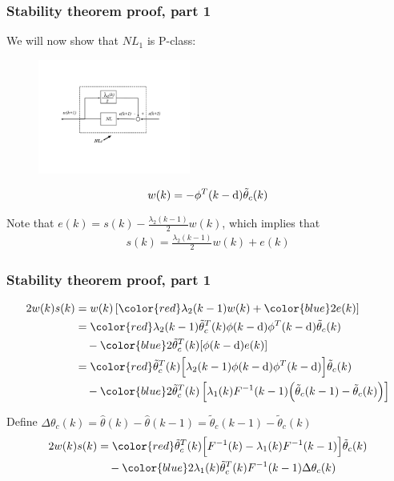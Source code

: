 \begin{frame}
    \frametitle{Stability theorem proof, part 1}

    We will now show that $NL_1$ is P-class:
    \begin{figure}[h]
        \centering
        \includegraphics[width=5cm]{figs_NL1}\\
    \end{figure}
    \begin{align*}
        w(k) = -\phi^T(k-\textrm{d}) \tilde{\theta}_c(k)
    \end{align*}
    \pause

    Note that $\displaystyle e(k) = s(k) - \frac{\lambda_2(k-1)}{2} w(k)$, which implies that
    \begin{align*}
        s(k) = \frac{\lambda_2(k-1)}{2} w(k) + e(k)
    \end{align*}

\end{frame}

\begin{frame}
    \frametitle{Stability theorem proof, part 1}

    \begin{align*}
        2 w(k) s(k) & = w(k) \left[ {\color{red} \lambda_2(k-1) w(k)}
            + {\color{blue} 2 e(k)} \right] \\
        & = {\color{red} \lambda_2(k-1) \tilde{\theta}_c^T(k) \phi(k-\drm) \phi^T(k-\drm)
            \tilde{\theta}_c(k) } \\
        & \quad - {\color{blue} 2 \tilde{\theta}_c^T(k) [ \phi(k-\drm) e(k) ] } \\
        & = {\color{red} \tilde{\theta}_c^T(k) \Big[ \lambda_2(k-1) \phi(k-\drm) \phi^T(k-\drm) \Big]
            \tilde{\theta}_c(k) } \\
        & \quad - {\color{blue} 2 \tilde{\theta}_c^T(k) \left[ \lambda_1(k) F^{-1}(k-1)
            \Big( \tilde{\theta}_c(k-1) - \tilde{\theta}_c(k) \Big) \right] }
    \end{align*}
    \pause

    Define $\Delta \theta_c(k) = \hat{\theta}(k) - \hat{\theta}(k-1) = \tilde{\theta}_c(k-1) - \tilde{\theta}_c(k)$
    \pause
    \begin{align*}
        2 w(k) s(k) & = {\color{red} \tilde{\theta}_c^T(k)
            \Big[ F^{-1}(k) - \lambda_1(k) F^{-1}(k-1) \Big] \tilde{\theta}_c(k) } \\
        & \quad - {\color{blue} 2 \lambda_1(k) \tilde{\theta}_c^T(k) F^{-1}(k-1) \Delta \theta_c(k) }
    \end{align*}
\end{frame}

